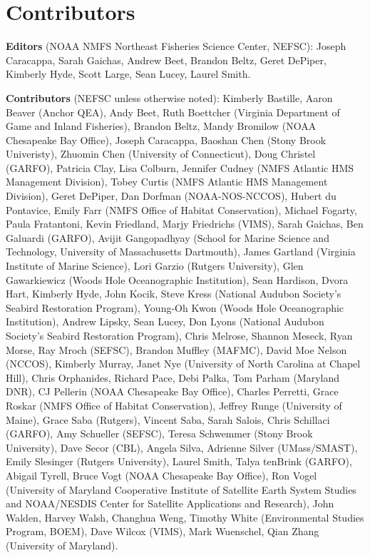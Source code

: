 \documentclass[
  10pt,
]{article}
\begin{document}
\hypertarget{contributors}{%
\section{Contributors}\label{contributors}}

\textbf{Editors} (NOAA NMFS Northeast Fisheries Science Center, NEFSC): Joseph Caracappa, Sarah Gaichas, Andrew Beet, Brandon Beltz, Geret DePiper, Kimberly Hyde, Scott Large, Sean Lucey, Laurel Smith.

\textbf{Contributors} (NEFSC unless otherwise noted): Kimberly Bastille, Aaron Beaver (Anchor QEA), Andy Beet, Ruth Boettcher (Virginia Department of Game and Inland Fisheries), Brandon Beltz, Mandy Bromilow (NOAA Chesapeake Bay Office), Joseph Caracappa, Baoshan Chen (Stony Brook Univeristy), Zhuomin Chen (University of Connecticut), Doug Christel (GARFO), Patricia Clay, Lisa Colburn, Jennifer Cudney (NMFS Atlantic HMS Management Division), Tobey Curtis (NMFS Atlantic HMS Management Division), Geret DePiper, Dan Dorfman (NOAA-NOS-NCCOS), Hubert du Pontavice, Emily Farr (NMFS Office of Habitat Conservation), Michael Fogarty, Paula Fratantoni, Kevin Friedland, Marjy Friedrichs (VIMS), Sarah Gaichas, Ben Galuardi (GARFO), Avijit Gangopadhyay (School for Marine Science and Technology, University of Massachusetts Dartmouth), James Gartland (Virginia Institute of Marine Science), Lori Garzio (Rutgers University), Glen Gawarkiewicz (Woods Hole Oceanographic Institution), Sean Hardison, Dvora Hart, Kimberly Hyde, John Kocik, Steve Kress (National Audubon Society's Seabird Restoration Program), Young-Oh Kwon (Woods Hole Oceanographic Institution), Andrew Lipsky, Sean Lucey, Don Lyons (National Audubon Society's Seabird Restoration Program), Chris Melrose, Shannon Meseck, Ryan Morse, Ray Mroch (SEFSC), Brandon Muffley (MAFMC), David Moe Nelson (NCCOS), Kimberly Murray, Janet Nye (University of North Carolina at Chapel Hill), Chris Orphanides, Richard Pace, Debi Palka, Tom Parham (Maryland DNR), CJ Pellerin (NOAA Chesapeake Bay Office), Charles Perretti, Grace Roskar (NMFS Office of Habitat Conservation), Jeffrey Runge (University of Maine), Grace Saba (Rutgers), Vincent Saba, Sarah Salois, Chris Schillaci (GARFO), Amy Schueller (SEFSC), Teresa Schwemmer (Stony Brook University), Dave Secor (CBL), Angela Silva, Adrienne Silver (UMass/SMAST), Emily Slesinger (Rutgers University), Laurel Smith, Talya tenBrink (GARFO), Abigail Tyrell, Bruce Vogt (NOAA Chesapeake Bay Office), Ron Vogel (University of Maryland Cooperative Institute of Satellite Earth System Studies and NOAA/NESDIS Center for Satellite Applications and Research), John Walden, Harvey Walsh, Changhua Weng, Timothy White (Environmental Studies Program, BOEM), Dave Wilcox (VIMS), Mark Wuenschel, Qian Zhang (University of Maryland).
\end{document}
